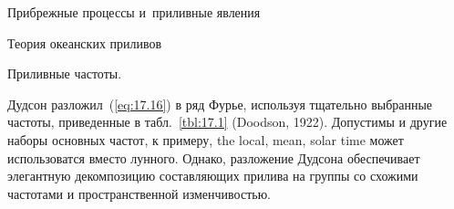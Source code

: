 \begin{chapter}{Прибрежные процессы и~приливные явления}
\begin{section}{Теория океанских приливов}
\begin{paragraph}{Приливные частоты.}

Дудсон разложил~(\ref{eq:17.16}) в ряд Фурье, используя тщательно выбранные
частоты, приведенные в табл.~\ref{tbl:17.1} (Doodson, 1922). 
Допустимы и другие наборы основных частот, к примеру,
the local, mean, solar time может использоватся вместо лунного.
Однако, разложение Дудсона обеспечивает элегантную декомпозицию составляющих
прилива на группы со схожими частотами и пространственной изменчивостью.
%


\end{paragraph}
\end{section}
\end{chapter}
